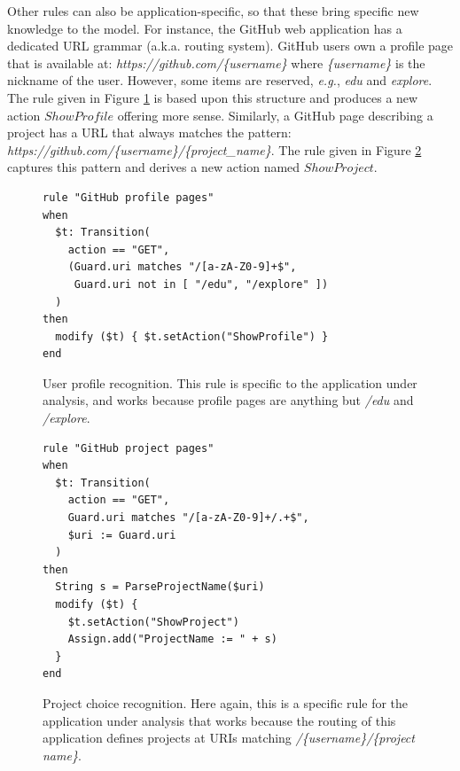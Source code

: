 Other rules can also be application-specific, so that these bring
specific new knowledge to the model. For instance, the GitHub web
application has a dedicated URL grammar (a.k.a. routing system).
GitHub users own a profile page that is available at:
\textit{https://github.com/\{username\}} where \textit{\{username\}}
is the nickname of the user. However, some items are reserved,
\emph{e.g.}, \textit{edu} and \textit{explore}. The rule given in Figure
\ref{fig:rule:gh-profile} is based upon this structure and
produces a new action $ShowProfile$ offering more sense.
Similarly, a GitHub page describing a project has a URL that
always matches the pattern:
\textit{https://github.com/\{username\}/\{project\_name\}}. The
rule given in Figure \ref{fig:rule:gh-project} captures this
pattern and derives a new action named $ShowProject$.

\begin{figure}[h]
\begin{framed}
\begin{BVerbatim}
rule "GitHub profile pages"
when
  $t: Transition(
    action == "GET",
    (Guard.uri matches "/[a-zA-Z0-9]+$",
     Guard.uri not in [ "/edu", "/explore" ])
  )
then
  modify ($t) { $t.setAction("ShowProfile") }
end
\end{BVerbatim}
\end{framed}

    \caption{User profile recognition. This rule is specific to the
    application under analysis, and works because profile pages are
    anything but \textit{/edu} and \textit{/explore}.}
    \label{fig:rule:gh-profile}
\end{figure}

\begin{figure}
\begin{framed}
\begin{BVerbatim}
rule "GitHub project pages"
when
  $t: Transition(
    action == "GET",
    Guard.uri matches "/[a-zA-Z0-9]+/.+$",
    $uri := Guard.uri
  )
then
  String s = ParseProjectName($uri)
  modify ($t) {
    $t.setAction("ShowProject")
    Assign.add("ProjectName := " + s)
  }
end
\end{BVerbatim}
\end{framed}

\caption{Project choice recognition. Here again, this is a
specific rule for the application under analysis that works
because the routing of this application defines projects at URIs
matching \textit{/\{username\}/\{project name\}}.}
\label{fig:rule:gh-project}
\end{figure}

